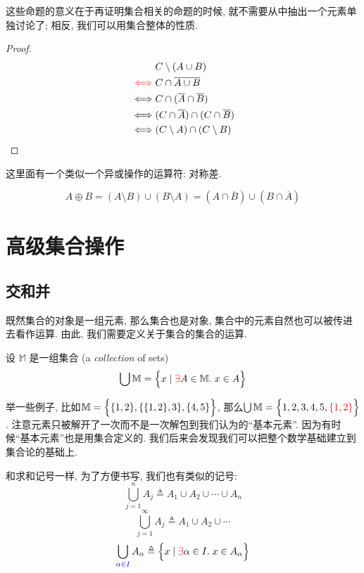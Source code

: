 这些命题的意义在于再证明集合相关的命题的时候, 就不需要从中抽出一个元素单独讨论了; 相反, 我们可以用集合整体的性质. 

\begin{proof}
  \setcounter{equation}{0}
  \begin{align*}
    &C \setminus (A \cup B) \\
    \textcolor{red}{\iff} & C \cap \overline{A \cup B} \\
    \iff & C \cap (\overline{A} \cap \overline{B}) \\
    \iff & (C \cap \overline{A}) \cap (C \cap \overline{B}) \\
    \iff & (C \setminus A) \cap (C \setminus B)
  \end{align*}
\end{proof}

这里面有一个类似一个异或操作的运算符: 对称差. 

\begin{definition}
  \[
    A \oplus B = (A \setminus B) \cup (B \setminus A)
      = (A \cap \overline{B}) \cup (B \cap \overline{A})
  \]
\end{definition}

\section{高级集合操作}
\subsection{交和并}

既然集合的对象是一组元素, 那么集合也是对象, 集合中的元素自然也可以被传进去看作运算. 由此, 我们需要定义关于集合的集合的运算. 

\begin{definition}
  设 $\mathbb{M}$ 是一组集合 (a {\it collection} of sets)
  \[
    \bigcup \mathbb{M} = \Big\{x \mid \textcolor{red}{\exists} A \in \mathbb{M}.\; x \in A\Big\}
  \]
\end{definition}

举一些例子, 比如$\mathbb{M} = \Big\{\{1, 2\}, \{\{1, 2\}, 3\}, \{4, 5\}\Big\}$, 那么$\bigcup \mathbb{M} = \Big\{1, 2, 3, 4, 5, \textcolor{red}{\{1, 2\}}\Big\}$. 注意元素只被解开了一次而不是一次解包到我们认为的``基本元素''. 因为有时候``基本元素''也是用集合定义的. 我们后来会发现我们可以把整个数学基础建立到集合论的基础上. 

和求和记号一样, 为了方便书写, 我们也有类似的记号: 
  \[
    \bigcup_{j = 1}^{n} A_j \triangleq A_1 \cup A_2 \cup \cdots \cup A_n
  \]
  \[
    \bigcup_{j = 1}^{\infty} A_j \triangleq A_1 \cup A_2 \cup \cdots
  \]
  \[
    \bigcup_{\textcolor{blue}{\alpha \in I}} A_{\alpha} \triangleq
      \Big\{x \mid \textcolor{red}{\exists} \alpha \in I.\; x \in A_{\alpha}\Big\}
  \]

